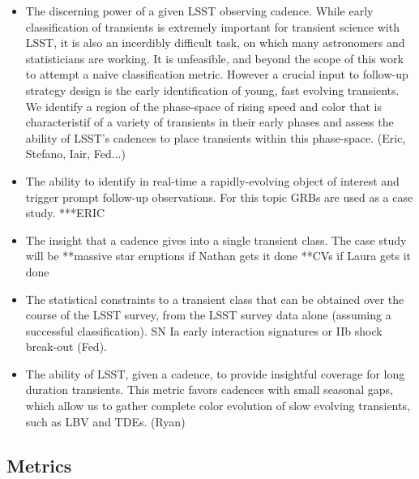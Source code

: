 \begin{itemize}
\item
  The discerning power of a given LSST observing cadence.
  While early classification of transients is extremely important for
  transient science with LSST, it is also an incerdibly difficult task,
  on which many astronomers and statisticians are working. It is unfeasible,
  and beyond the scope of this work to attempt a naive classification metric.
  However a crucial input to follow-up strategy design is the early
  identification of young, fast evolving transients. We identify a region of
  the phase-space of rising speed and color that is characteristif of a
  variety of transients in their early phases and assess the ability of LSST's
  cadences to place transients within this phase-space. (Eric, Stefano, Iair, Fed...)
\item
  The ability to identify in real-time a rapidly-evolving 
  object of interest and
  trigger prompt follow-up observations. For this topic GRBs are used as
  a case study. ***ERIC
\item
  The insight that a cadence gives into a single transient class. The
  case study will be
  **massive star eruptions if Nathan gets it done
  **CVs if Laura gets it done
\item 
  The statistical constraints to a transient class that can be obtained
  over the course of the LSST survey, from the LSST survey data alone
  (assuming a successful classification). SN Ia early interaction
  signatures or IIb shock break-out (Fed).
\item
  The ability of LSST, given a cadence, to provide insightful coverage
  for long duration transients. This metric favors cadences with small
  seasonal gaps, which allow us to gather complete color evolution of
  slow evolving transients, such as LBV and TDEs. (Ryan)

\end{itemize}



\subsection{Metrics}
\label{sec:\chpname:metrics}

